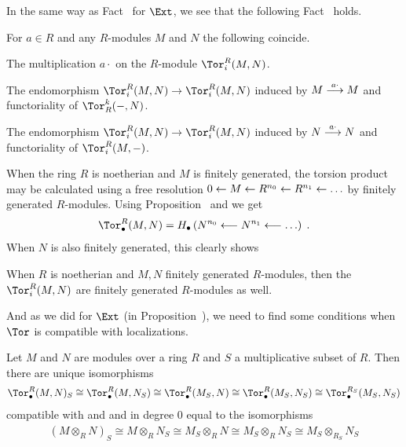 \documentclass[a4paper,parskip=half,numbers=enddot, DIV=12]{scrreprt}
\begin{document}
In the same way as Fact~ for $\Ext$, we see that the following Fact~ holds.
\begin{fact}
	For $a\in R$ and any $R$-modules $M$ and $N$ the following coincide.
	\begin{alphanumerate}
		\item The multiplication $a\cdot $ on the $R$-module $\Tor_i^R(M,N)$.
		\item The endomorphism $\Tor_i^R(M,N)\morphism\Tor_i^R(M,N)$ induced by $M\morphism[a\cdot ]M$ and functoriality of $\Tor_R^k(-,N)$.
		\item The endomorphism $\Tor_i^R(M,N)\morphism\Tor_i^R(M,N)$ induced by $N\morphism[a\cdot ]N$ and functoriality of $\Tor_i^R(M,-)$.
	\end{alphanumerate}
\end{fact}
When the ring $R$ is noetherian and $M$ is finitely generated, the torsion product may be calculated using a free resolution $0\lmorphism M\lmorphism R^{n_0}\lmorphism R^{n_1}\lmorphism\ldots$ by finitely generated $R$-modules. Using Proposition~ and  we get
\begin{align*}
	\Tor_\bullet^R(M,N)=H_\bullet\left(N^{n_0}\lmorphism N^{n_1}\lmorphism\ldots\right)\;.
\end{align*}
When $N$ is also finitely generated, this clearly shows
\begin{fact}
	When $R$ is noetherian  and $M,N$ finitely generated $R$-modules, then the $\Tor_i^R(M,N)$ are finitely generated $R$-modules as well.
\end{fact}
And as we did for $\Ext$ (in Proposition~), we need to find some conditions when $\Tor$ is compatible with localizations.
\begin{fact}
	Let $M$ and $N$ are modules over a ring $R$ and $S$ a multiplicative subset of $R$. Then there are unique isomorphisms
	\begin{align*}
		\Tor_\bullet^R(M,N)_S\cong \Tor_\bullet^R(M,N_S)\cong \Tor_\bullet^R(M_S,N)\cong \Tor_\bullet^R(M_S,N_S)\cong \Tor_\bullet^{R_S}(M_S,N_S)
	\end{align*}
	compatible with  and  and in degree $0$ equal to the isomorphisms
	\begin{align*}
		(M\otimes _RN)_S\cong M\otimes _RN_S\cong M_S\otimes _RN\cong M_S\otimes _RN_S\cong {M_S}\otimes _{R_S}N_S
	\end{align*}
\end{fact}
\end{document}
